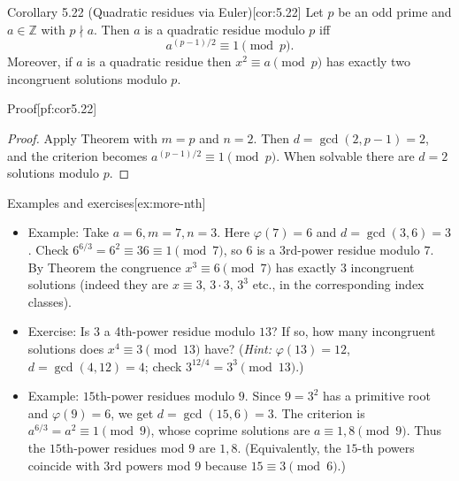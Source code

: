 \documentclass[10pt]{article}
\theoremstyle{definition}
\theoremstyle{plain}
\numberwithin{equation}{section}
\begin{document}
\begin{define}{Corollary 5.22 (Quadratic residues via Euler)}[cor:5.22]
Let \(p\) be an odd prime and \(a\in\mathbb{Z}\) with \(p\nmid a\). Then \(a\) is a quadratic residue modulo \(p\) iff
\[
a^{(p-1)/2}\equiv 1\pmod p.
\]
Moreover, if \(a\) is a quadratic residue then \(x^2\equiv a\pmod p\) has exactly two incongruent solutions modulo \(p\).
\end{define}

\begin{define}{Proof}[pf:cor5.22]
\begin{proof}
Apply Theorem  with \(m=p\) and \(n=2\). Then \(d=\gcd(2,p-1)=2\), and the criterion becomes \(a^{(p-1)/2}\equiv1\pmod p\). When solvable there are \(d=2\) solutions modulo \(p\).
\end{proof}
\end{define}

\bigskip

\begin{define}{Examples and exercises}[ex:more-nth]
\begin{itemize}
  \item Example: Take \(a=6,m=7,n=3\). Here \(\varphi(7)=6\) and \(d=\gcd(3,6)=3\). Check \(6^{6/3}=6^2\equiv 36\equiv1\pmod7\), so \(6\) is a 3rd-power residue modulo \(7\). By Theorem  the congruence \(x^3\equiv6\pmod7\) has exactly \(3\) incongruent solutions (indeed they are \(x\equiv 3,\,3\cdot 3,\,3^3\) etc., in the corresponding index classes).
  \item Exercise: Is \(3\) a 4th-power residue modulo \(13\)? If so, how many incongruent solutions does \(x^4\equiv 3\pmod{13}\) have? (\emph{Hint:} \(\varphi(13)=12\), \(d=\gcd(4,12)=4\); check \(3^{12/4}=3^3\pmod{13}\).)
  \item Example: \(15\)th-power residues modulo \(9\). Since \(9=3^2\) has a primitive root and \(\varphi(9)=6\), we get \(d=\gcd(15,6)=3\). The criterion is \(a^{6/3}=a^2\equiv1\pmod9\), whose coprime solutions are \(a\equiv 1,8\pmod9\). Thus the \(15\)th-power residues mod \(9\) are \(1,8\). (Equivalently, the $15$-th powers coincide with $3$rd powers mod 9 because $15\equiv3\pmod6$.)
\end{itemize}
\end{define}

\end{document}
